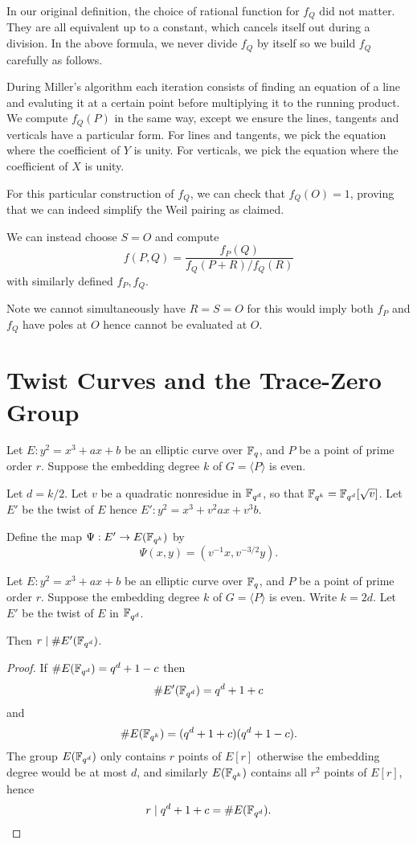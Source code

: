 In our original definition, the choice of rational function for $f_Q$
did not matter. They are all equivalent up to a constant,
which cancels itself out during a division. In the above formula,
we never divide $f_Q$ by itself so we build $f_Q$ carefully as follows.

During Miller's algorithm each iteration consists of finding an equation of
a line and evaluting it at a certain point before multiplying it to the
running product. We compute $f_Q(P)$ in the same way, except we ensure
the lines, tangents and verticals have a particular form. For lines and
tangents, we pick the equation where the coefficient of $Y$ is unity.
For verticals, we pick the equation where the coefficient of $X$ is unity.

For this particular construction of $f_Q$, we can check that $f_Q(O) = 1$,
proving that we can indeed simplify the Weil pairing as claimed.

We can instead choose $S = O$ and compute
\[ f(P,Q) = \frac{f_P(Q)}{f_Q(P+R)/f_Q(R)} \]
with similarly defined $f_P, f_Q$.

Note we cannot simultaneously have $R = S = O$ for this would imply
both $f_P$ and $f_Q$ have poles at $O$ hence cannot be evaluated at $O$.

\section {\label{sec:twistcurves}Twist Curves and the Trace-Zero Group}

Let $E : y^2 = x^3 + a x + b$ be an elliptic curve over $\mathbb{F}_q$,
and $P$ be a point of prime order $r$.
Suppose the embedding degree $k$ of $G = \langle P \rangle$ is even.

Let $d = k / 2$. Let $v$ be a quadratic nonresidue in $\mathbb{F}_{q^d}$,
so that $\mathbb{F}_{q^k} = \mathbb{F}_{q^d}[\sqrt{v}]$.
Let $E'$ be the twist of $E$ hence
$E' : y^2 = x^3 + v^2 a x + v^3 b$.

Define the map $\Psi:E'\rightarrow E(\mathbb{F}_{q^k})$ by
\[ \Psi(x,y) = (v^{-1}x, v^{-3/2}y) . \]

\begin{theorem}
Let $E : y^2 = x^3 + a x + b$ be an elliptic curve over $\mathbb{F}_q$,
and $P$ be a point of prime order $r$.
Suppose the embedding degree $k$ of $G = \langle P \rangle$ is even.
Write $k = 2d$. Let $E'$ be the twist of $E$ in $\mathbb{F}_{q^d}$.

Then $r \mid \#E'(\mathbb{F}_{q^d})$.
\end{theorem}

\begin{proof}
If $\#E(\mathbb{F}_{q^d}) = q^d + 1 - c$ then
\[ \#E'(\mathbb{F}_{q^d}) = q^d + 1 + c \]
and
\[ \#E(\mathbb{F}_{q^k}) = (q^{d} + 1 + c)(q^{d} + 1 - c) . \]
The group $E(\mathbb{F}_{q^d})$ only contains $r$ points of $E[r]$ otherwise
the embedding degree would be at most $d$, and similarly
$E(\mathbb{F}_{q^k})$ contains all $r^2$ points of $E[r]$,
hence
\[ r \mid q^{d} + 1 + c = \#E(\mathbb{F}_{q^d}) .\]
\end{proof}

